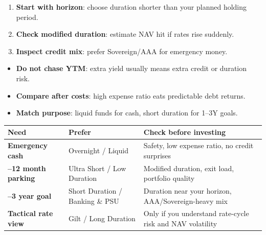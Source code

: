 \documentclass[11pt,a4paper]{article}
\begin{document}
\vspace{4pt}
\begin{infobox}[title=How to Analyze a Debt Fund in 60 Seconds]
\small
\begin{multicols}{2}
\begin{enumerate}[leftmargin=1.4em]
  \item \textbf{Start with horizon}: choose duration shorter than your planned holding period.
  \item \textbf{Check modified duration}: estimate NAV hit if rates rise suddenly.
  \item \textbf{Inspect credit mix}: prefer Sovereign/AAA for emergency money.
\end{enumerate}
\columnbreak
\begin{itemize}
  \item \textbf{Do not chase YTM}: extra yield usually means extra credit or duration risk.
  \item \textbf{Compare after costs}: high expense ratio eats predictable debt returns.
  \item \textbf{Match purpose}: liquid funds for cash, short duration for 1--3Y goals.
\end{itemize}
\end{multicols}
\end{infobox}

\vspace{3pt}
\begin{tcolorbox}[
  enhanced, colback=lightbg, colframe=primary!55, arc=3pt,
  boxrule=0.8pt, left=6pt, right=6pt, top=4pt, bottom=4pt,
  fonttitle=\small\bfseries\sffamily\color{white},
  title=Debt Fund Choice by Use Case,
  boxed title style={colback=primary!80, arc=2pt, boxrule=0pt},
  attach boxed title to top left={yshift=-2mm, xshift=6mm}
]
\small
\begin{tabularx}{\linewidth}{>{\raggedright\arraybackslash\bfseries\sffamily}p{3.1cm} >{\raggedright\arraybackslash}X >{\raggedright\arraybackslash}X}
\textcolor{primary}{Need} & \textcolor{primary}{Prefer} & \textcolor{primary}{Check before investing} \\
\hline
Emergency cash & Overnight / Liquid & Safety, low expense ratio, no credit surprises \\
3--12 month parking & Ultra Short / Low Duration & Modified duration, exit load, portfolio quality \\
1--3 year goal & Short Duration / Banking \& PSU & Duration near your horizon, AAA/Sovereign-heavy mix \\
Tactical rate view & Gilt / Long Duration & Only if you understand rate-cycle risk and NAV volatility \\
\end{tabularx}
\end{tcolorbox}
\end{document}

